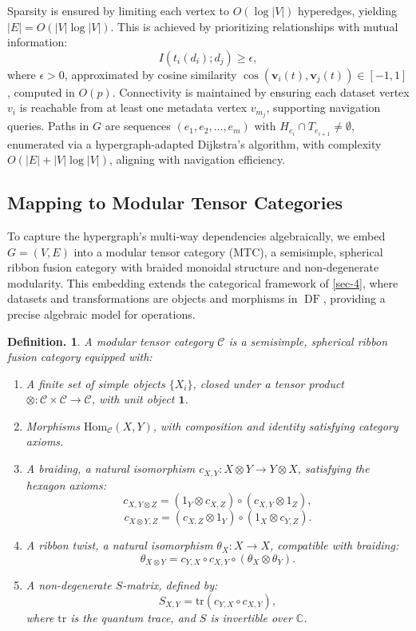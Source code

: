 \documentclass{amsart}
\newtheorem{defn}[thm]{Definition.}
\newcommand\C{\mathbb C}
\newcommand\bv{\mathbf v}
\DeclareMathOperator\DF{DF}
\begin{document}
Sparsity is ensured by limiting each vertex to \( O(\log |V|) \) hyperedges, yielding \( |E| = O(|V| \log |V|) \). This is achieved by prioritizing relationships with mutual information:
\[
I(t_i(d_i); d_j) \geq \epsilon,
\]
where \( \epsilon > 0 \), approximated by cosine similarity \( \cos(\bv_i(t), \bv_j(t)) \in [-1, 1] \), computed in \( O(p) \). Connectivity is maintained by ensuring each dataset vertex \( v_i \) is reachable from at least one metadata vertex \( v_{m_j} \), supporting navigation queries.
%
Paths in \( G \) are sequences \( (e_1, e_2, \dots, e_m) \) with \( H_{e_i} \cap T_{e_{i+1}} \neq \emptyset \), enumerated via a hypergraph-adapted Dijkstra’s algorithm, with complexity \( O(|E| + |V| \log |V|) \), aligning with navigation efficiency.


\subsection{Mapping to Modular Tensor Categories} \label{subsec:mtc_mapping}

To capture the hypergraph’s multi-way dependencies algebraically, we embed \( G = (V, E) \) into a modular tensor category (MTC), a semisimple, spherical ribbon fusion category with braided monoidal structure and non-degenerate modularity. This embedding extends the categorical framework of \cref{sec-4}, where datasets and transformations are objects and morphisms in \( \DF \), providing a precise algebraic model for operations.

\begin{defn} \label{defn:mtc}
A \emph{modular tensor category} \( \mathcal{C} \) is a semisimple, spherical ribbon fusion category equipped with:
\begin{enumerate}
    \item A finite set of \emph{simple objects} \( \{X_i\} \), closed under a tensor product \( \otimes: \mathcal{C} \times \mathcal{C} \to \mathcal{C} \), with unit object \( \mathbf{1} \).
    \item \emph{Morphisms} \( \text{Hom}_{\mathcal{C}}(X, Y) \), with composition and identity satisfying category axioms.
    \item A \emph{braiding}, a natural isomorphism \( c_{X,Y}: X \otimes Y \to Y \otimes X \), satisfying the hexagon axioms:
    \[
    c_{X, Y \otimes Z} = (1_Y \otimes c_{X,Z}) \circ (c_{X,Y} \otimes 1_Z),
    \]
    \[
    c_{X \otimes Y, Z} = (c_{X,Z} \otimes 1_Y) \circ (1_X \otimes c_{Y,Z}).
    \]
    \item A \emph{ribbon twist}, a natural isomorphism \( \theta_X: X \to X \), compatible with braiding:
    \[
    \theta_{X \otimes Y} = c_{Y,X} \circ c_{X,Y} \circ (\theta_X \otimes \theta_Y).
    \]
    \item A non-degenerate \emph{\( S \)-matrix}, defined by:
    \[
    S_{X,Y} = \text{tr}(c_{Y,X} \circ c_{X,Y}),
    \]
    where \( \text{tr} \) is the quantum trace, and \( S \) is invertible over \( \C \).
\end{enumerate}
\end{defn}
\end{document}
